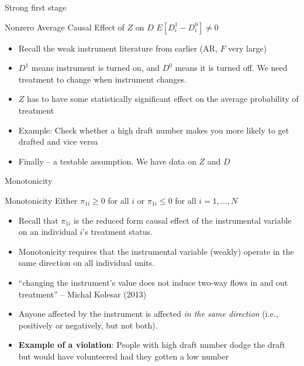 \documentclass{beamer}
\begin{document}
\begin{frame}{Strong first stage}
	
	\begin{block}{Nonzero Average Causal Effect of $Z$ on $D$}
	$E[D^1_{i} - D^0_{i}]\neq{0}$
	\end{block}
				
\begin{itemize}
\item Recall the weak instrument literature from earlier (AR, $F$ very large)
\item $D^1$ means instrument is turned on, and $D^0$ means it is turned off. We need treatment to change when instrument changes.
\item $Z$ has to have some statistically significant effect on the average probability of treatment
\item Example: Check whether a high draft number makes you more likely to get drafted and vice versa
\item Finally -- a testable assumption. We have data on $Z$ and $D$
\end{itemize}

\end{frame}			


\begin{frame}{Monotonicity}
	
	\begin{block}{Monotonicity}
	Either $\pi_{1i}\geq{0}$ for all $i$ or $\pi_{1i}\leq{0}$ for all $i=1, \dots, N$
	\end{block}

\begin{itemize}

\item Recall that $\pi_{1i}$ is the reduced form causal effect of the instrumental variable on an individual $i$'s treatment status.  
\item Monotonicity requires that the instrumental variable (weakly) operate in the same direction on all individual units.  
\item ``changing the instrument's value does not induce two-way flows in and out treatment'' -- Michal Kolesar (2013)
\item Anyone affected by the instrument is affected \emph{in the same direction} (i.e., positively or negatively, but not both).
\item \textbf{Example of a violation}: People with high draft number dodge the draft but would have volunteered had they gotten a low number

\end{itemize}

\end{frame}
\end{document}
